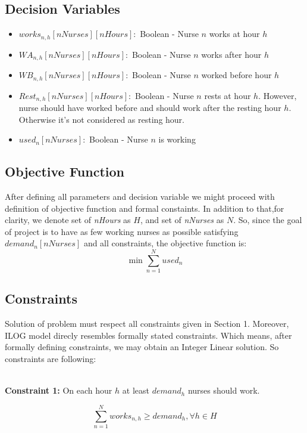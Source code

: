 \documentclass{article}
\newcommand\tab[1][1cm]{\hspace*{#1}}
\begin{document}
	\subsection{Decision Variables}
	\begin{itemize}
		\item $works_{n,h}[nNurses][nHours]:$ Boolean - Nurse $n$ works at hour $h$
		\item $WA_{n,h}[nNurses][nHours]:$ Boolean - Nurse $n$ works after hour $h$
		\item $WB_{n,h}[nNurses][nHours]:$ Boolean - Nurse $n$ worked before hour $h$
		\item $Rest_{n,h}[nNurses][nHours]:$ Boolean - Nurse $n$ rests at hour $h$. However, nurse should have worked before and should work after the resting hour $h$. Otherwise it's not considered as resting hour.
		\item $used_n[nNurses]:$ Boolean - Nurse $n$ is working
	\end{itemize}
	
	\subsection{Objective Function}
\tab After defining all parameters and decision variable we might proceed with definition of objective function and formal constaints. In addition to that,for clarity, we denote set of \textit{nHours} as $H$, and set of \textit{nNurses} as $N$. So, since the goal of project is to have as few working nurses as possible satisfying $demand_n[nNurses]$ and all constraints, the objective function is:
\begin{equation}
	\min \sum_{n=1}^N used_n 
\end{equation}
	\subsection{Constraints}
\tab Solution of problem must respect all constraints given in Section 1. Moreover, ILOG model direcly resembles formally stated constraints. Which means, after formally defining constraints, we may obtain an Integer Linear solution. So constraints are following:\\\\

\begin{minipage}{\linewidth}
\tab \caption{\textbf{Constraint 1:} On each hour $h$ at least $demand_h$ nurses should work.}
	\begin{equation}
		\sum_{n=1}^N works_{n,h} \geq demand_h, \forall h \in H
	\end{equation}
\end{minipage}
\end{document}
